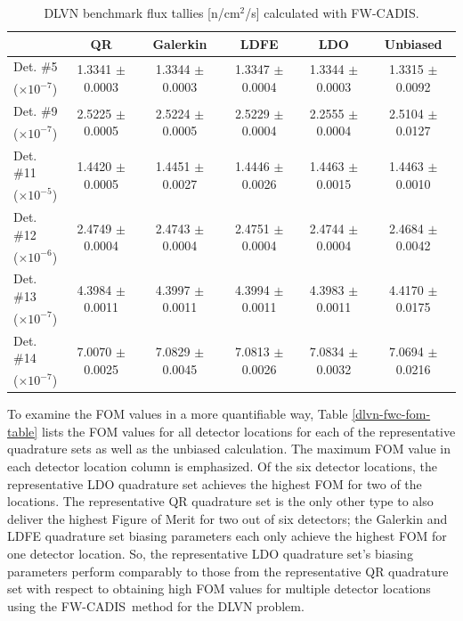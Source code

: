 \documentclass{article} %
\newcommand{\E}[1]{$\times10^{#1}$}
\newcommand{\fwc}{\mbox{FW-CADIS}}
\newcommand{\mr}[1]{\multirow{2}{*}{#1}}
\begin{document}
\begin{table}[!htb]
\centering
\scriptsize
\caption{DLVN benchmark flux tallies [n/cm$^2$/s] calculated with \fwc.}
\label{dlvn-fwc-det}
\begin{tabular}{l|ccccc}
         & \textbf{QR} & \textbf{Galerkin} & \textbf{LDFE} 
         & \textbf{LDO} & \textbf{Unbiased}  \\ \hline
 Det. \#5 & \mr{1.3341 $\pm$ 0.0003} & \mr{1.3344 $\pm$ 0.0003} & \mr{1.3347 $\pm$ 0.0004} &
            \mr{1.3344 $\pm$ 0.0003} & \mr{1.3315 $\pm$ 0.0092} \rule{0pt}{2.6ex} \\
    (\E{-7})      &    &   &  &   &    \\
 Det. \#9 & \mr{2.5225 $\pm$ 0.0005} & \mr{2.5224 $\pm$ 0.0005} & \mr{2.5229 $\pm$ 0.0004} &
            \mr{2.2555 $\pm$ 0.0004} & \mr{2.5104 $\pm$ 0.0127} \rule{0pt}{2.6ex}  \\
   (\E{-7}) &   &  &  &  &   \\
 Det. \#11 & \mr{1.4420 $\pm$ 0.0005} & \mr{1.4451 $\pm$ 0.0027} & \mr{1.4446 $\pm$ 0.0026} &
            \mr{1.4463 $\pm$ 0.0015} & \mr{1.4463 $\pm$ 0.0010} \rule{0pt}{2.6ex} \\
   (\E{-5}) &   &  &  &  &   \\
 Det. \#12 & \mr{2.4749 $\pm$ 0.0004} & \mr{2.4743 $\pm$ 0.0004} & \mr{2.4751 $\pm$ 0.0004} &
            \mr{2.4744 $\pm$ 0.0004} & \mr{2.4684 $\pm$ 0.0042}  \rule{0pt}{2.6ex} \\
    (\E{-6}) &   &  &  &  &   \\
 Det. \#13 & \mr{4.3984 $\pm$ 0.0011} & \mr{4.3997 $\pm$ 0.0011} & \mr{4.3994 $\pm$ 0.0011} &
            \mr{4.3983 $\pm$ 0.0011} & \mr{4.4170 $\pm$ 0.0175}  \rule{0pt}{2.6ex} \\
    (\E{-7}) &   &  &  &  &   \\
 Det. \#14 & \mr{7.0070 $\pm$ 0.0025} & \mr{7.0829 $\pm$ 0.0045} & \mr{7.0813 $\pm$ 0.0026} &
            \mr{7.0834 $\pm$ 0.0032} & \mr{7.0694 $\pm$ 0.0216}  \rule{0pt}{2.6ex} \\
    (\E{-7}) &   &  &  &  &   \\ \hline
\end{tabular}
\end{table}

To examine the FOM values in a more quantifiable way, Table 
\ref{dlvn-fwc-fom-table} lists the FOM values for all detector locations for
each of the representative quadrature sets as well as the unbiased calculation.
The maximum FOM value in each detector location column is emphasized. Of the
six detector locations, the representative LDO quadrature set achieves the
highest FOM for two of the locations. The representative QR quadrature set is
the only other type to also deliver the highest Figure of Merit for two out of
six detectors; the Galerkin and LDFE quadrature set biasing parameters each
only achieve the highest FOM for one detector location. So, the representative
LDO quadrature set's biasing parameters perform comparably to those from the
representative QR quadrature set with respect to obtaining high FOM values for
multiple detector locations using the \fwc\ method for the DLVN problem.
\end{document}
